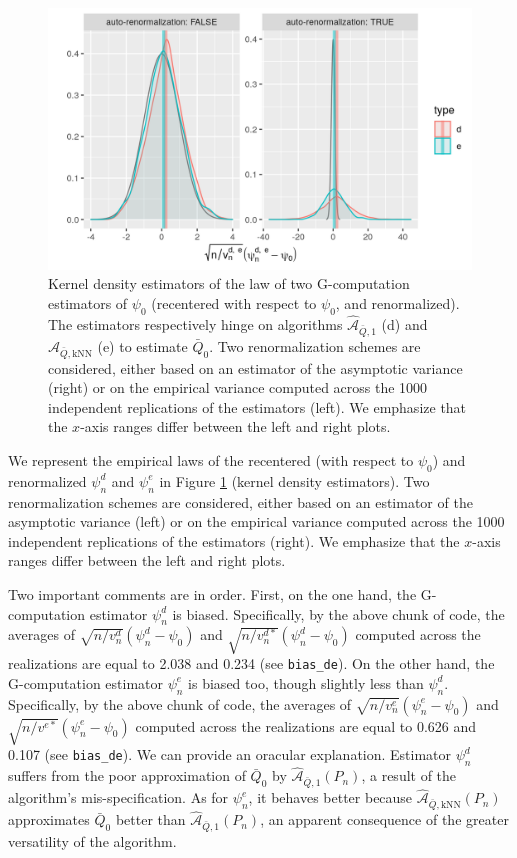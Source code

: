\documentclass[
  11pt,
  openright,twoside]{book}
\newcommand{\Algo}{\widehat{\mathcal{A}}}
\newcommand{\Qbar}{\bar{Q}}
\theoremstyle{definition}
\theoremstyle{definition}
\theoremstyle{definition}
\theoremstyle{definition}
\theoremstyle{remark}
\begin{document}
\begin{figure}

{\centering \includegraphics[width=0.7\linewidth]{img/estimating-Qbar-one-bis-1} 

}

\caption{Kernel density estimators of the law of two G-computation estimators of \(\psi_{0}\) (recentered with respect to \(\psi_{0}\), and renormalized). The estimators respectively hinge on algorithms \(\Algo_{\Qbar,1}\) (d) and \(\Algo_{\Qbar,\text{kNN}}\) (e) to estimate \(\Qbar_{0}\). Two renormalization schemes are considered, either based on an estimator of the asymptotic variance (right) or on the empirical variance computed across the 1000 independent replications of the estimators (left). We emphasize that the \(x\)-axis ranges differ between the left and right plots.}\label{fig:estimating-Qbar-one-bis}
\end{figure}

We represent the empirical laws of the recentered (with respect to \(\psi_{0}\)) and renormalized \(\psi_{n}^{d}\) and \(\psi_{n}^{e}\) in Figure \ref{fig:estimating-Qbar-one-bis} (kernel density estimators). Two renormalization schemes are considered, either based on an estimator of the asymptotic variance (left) or on the empirical variance computed across the 1000 independent replications of the estimators (right). We emphasize that the \(x\)-axis ranges differ between the left and right plots.

Two important comments are in order. First, on the one hand, the
G-computation estimator \(\psi_{n}^{d}\) is biased. Specifically, by the above
chunk of code, the averages of \(\sqrt{n/v_{n}^{d}} (\psi_{n}^{d} - \psi_{0})\)
and \(\sqrt{n/v_{n}^{d*}} (\psi_{n}^{d} - \psi_{0})\) computed across the
realizations are equal to 2.038 and 0.234 (see \texttt{bias\_de}). On the other hand, the G-computation
estimator \(\psi_{n}^{e}\) is biased too, though slightly less than
\(\psi_{n}^{d}\). Specifically, by the above chunk of code, the averages of
\(\sqrt{n/v_{n}^{e}} (\psi_{n}^{e} - \psi_{0})\) and \(\sqrt{n/v^{e*}} (\psi_{n}^{e} - \psi_{0})\) computed across the realizations are equal to
0.626 and 0.107 (see
\texttt{bias\_de}). We can provide an oracular explanation. Estimator \(\psi_{n}^{d}\)
suffers from the poor approximation of \(\Qbar_{0}\) by
\(\Algo_{\Qbar,1}(P_{n})\), a result of the algorithm's mis-specification. As
for \(\psi_{n}^{e}\), it behaves better because \(\Algo_{\Qbar,\text{kNN}} (P_{n})\) approximates \(\Qbar_{0}\) better than \(\Algo_{\Qbar,1}(P_{n})\), an
apparent consequence of the greater versatility of the algorithm.
\end{document}
